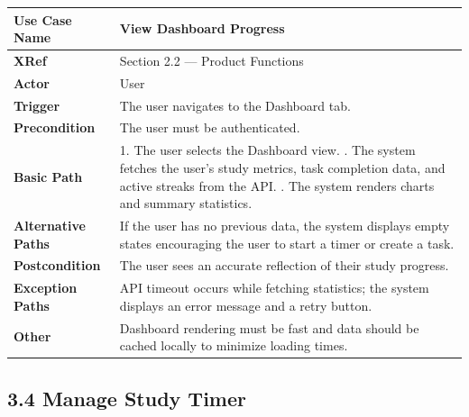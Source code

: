 \documentclass[12pt]{article}
\begin{document}
\renewcommand{\arraystretch}{1.5}
\begin{xltabular}{\textwidth}{|p{4cm}|X|}
\hline
\textbf{Use Case Name} & \textbf{View Dashboard Progress} \\ \hline
\textbf{XRef} & Section 2.2 — Product Functions \\ \hline
\textbf{Actor} & User \\ \hline
\textbf{Trigger} & The user navigates to the Dashboard tab. \\ \hline
\textbf{Precondition} & The user must be authenticated. \\ \hline
\textbf{Basic Path} & 1. The user selects the Dashboard view. . The system fetches the user's study metrics, task completion data, and active streaks from the API. . The system renders charts and summary statistics. \\ \hline
\textbf{Alternative Paths} & If the user has no previous data, the system displays empty states encouraging the user to start a timer or create a task. \\ \hline
\textbf{Postcondition} & The user sees an accurate reflection of their study progress. \\ \hline
\textbf{Exception Paths} & API timeout occurs while fetching statistics; the system displays an error message and a retry button. \\ \hline
\textbf{Other} & Dashboard rendering must be fast and data should be cached locally to minimize loading times. \\ \hline
\end{xltabular}

\subsection*{3.4 Manage Study Timer}
\end{document}
